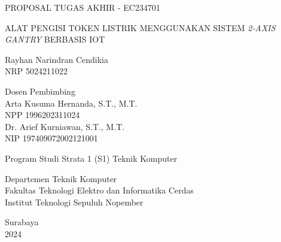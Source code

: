 \begin{large}
  PROPOSAL TUGAS AKHIR - EC234701
\end{large}

\vspace{\fill}

\begin{spacing}{1.5}
  \begin{Large}
    ALAT PENGISI TOKEN LISTRIK MENGGUNAKAN SISTEM \emph{2-AXIS GANTRY}
    BERBASIS IOT
  \end{Large}
\end{spacing}

\vspace{\fill}

\begin{large}
  Rayhan Narindran Cendikia \\
  \textmd{NRP 5024211022}
\end{large}

\vspace{\fill}

\begin{large}
  \textmd{Dosen Pembimbing} \\
  Arta Kusuma Hernanda, S.T., M.T. \\
  \textmd{NPP 1996202311024} \\
  Dr. Arief Kurniawan, S.T., M.T. \\
  \textmd{NIP 197409072002121001}
\end{large}

\vspace{\fill}

Program Studi Strata 1 (S1) Teknik Komputer \\

\mdseries

Departemen Teknik Komputer \\
Fakultas Teknologi Elektro dan Informatika Cerdas \\
Institut Teknologi Sepuluh Nopember

Surabaya \\
2024
